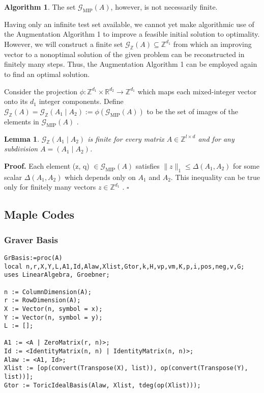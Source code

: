 \documentclass{article}
\theoremstyle{plain}
\newtheorem{lemma}[theorem]{Lemma}
\theoremstyle{definition}
\newtheorem{algorithm}[theorem]{Algorithm}
\begin{document}
\begin{algorithm}
The set $\mathcal{G}_{\mathrm{MIP}}(A)$, however, is not necessarily finite. 

Having only an infinite test set available, we cannot yet make algorithmic use of the Augmentation Algorithm 1 to improve a feasible initial solution to optimality. However, we will construct a finite set  $\mathcal{G}_{\mathbb{Z}}(A) \subseteq \mathbb{Z}^{d_{1}}$  from which an improving vector to a nonoptimal solution of the given problem can be reconstructed in finitely many steps. Thus, the Augmentation Algorithm 1 can be employed again to find an optimal solution.

Consider the projection  $\phi: \mathbb{Z}^{d_{1}} \times \mathbb{R}^{d_{2}} \rightarrow \mathbb{Z}^{d_{1}}$  which maps each mixed-integer vector onto its  $d_{1}$  integer components. Define  $\mathcal{G}_{\mathbb{Z}}(A)=\mathcal{G}_{\mathbb{Z}}\left(A_{1} \mid A_{2}\right):=\phi\left(\mathcal{G}_{\mathrm{MIP}}(A)\right)$  to be the set of images of the elements in  $\mathcal{G}_{\mathrm{MIP}}(A)$ .

\begin{lemma} $\mathcal{G}_{\mathbb{Z}}\left(A_{1} \mid A_{2}\right)$  is finite for every matrix  $A \in \mathbb{Z}^{l \times d}$  and for any subdivision  $A=\left(A_{1} \mid A_{2}\right) $.\end{lemma}

\noindent\textbf{Proof.} Each element  (z, q) $\in \mathcal{G}_{\mathrm{MIP}}(A)$  satisfies  $\|z\|_{1} \leq \Delta\left(A_{1}, A_{2}\right) $ for some scalar  $\Delta\left(A_{1}, A_{2}\right)$  which depends only on  $A_{1}$  and  $A_{2}$. This inequality can be true only for finitely many vectors  $z \in \mathbb{Z}^{d_{1}}$ . \hfill$\square$



\newpage 
\subsection{Maple Codes}
\subsubsection{Graver Basis}
\begin{verbatim}
GrBasis:=proc(A)  
local n,r,X,Y,L,A1,Id,Alaw,Xlist,Gtor,k,H,vp,vm,K,p,i,pos,neg,v,G;  
uses LinearAlgebra, Groebner;

n := ColumnDimension(A);
r := RowDimension(A);
X := Vector(n, symbol = x);
Y := Vector(n, symbol = y);
L := [];

A1 := <A | ZeroMatrix(r, n)>;
Id := <IdentityMatrix(n, n) | IdentityMatrix(n, n)>;
Alaw := <A1, Id>;
Xlist := [op(convert(Transpose(X), list)), op(convert(Transpose(Y), list))];
Gtor := ToricIdealBasis(Alaw, Xlist, tdeg(op(Xlist)));


\end{verbatim}
\end{algorithm}
\end{document}
